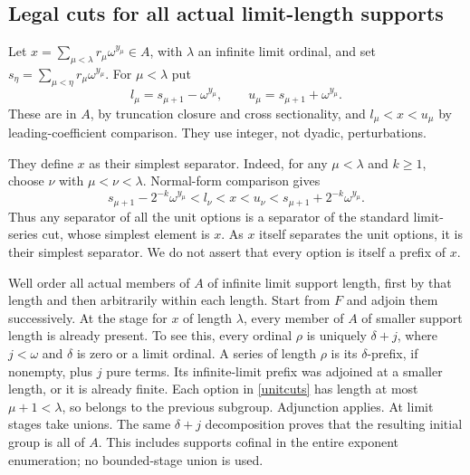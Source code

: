\documentclass[11pt]{article}
\begin{document}
\subsection{Legal cuts for all actual limit-length supports}
Let $x=\sum_{\mu<\lambda}r_\mu\omega^{y_\mu}\in A$, with $\lambda$ an
infinite limit ordinal, and set
$s_\eta=\sum_{\mu<\eta}r_\mu\omega^{y_\mu}$.
For $\mu<\lambda$ put
\begin{equation}\label{unitcuts}
 l_\mu=s_{\mu+1}-\omega^{y_\mu},\qquad
 u_\mu=s_{\mu+1}+\omega^{y_\mu}.
\end{equation}
These are in $A$, by truncation closure and cross sectionality, and
$l_\mu<x<u_\mu$ by leading-coefficient comparison.
They use integer, not dyadic, perturbations.

They define $x$ as their simplest separator. Indeed, for any $\mu<\lambda$
and $k\ge1$, choose $\nu$ with $\mu<\nu<\lambda$. Normal-form comparison
gives
\begin{equation}\label{cofinal}
 s_{\mu+1}-2^{-k}\omega^{y_\mu}
 <l_\nu<x<u_\nu<
 s_{\mu+1}+2^{-k}\omega^{y_\mu}.
\end{equation}
Thus any separator of all the unit options is a separator of the standard
limit-series cut, whose simplest element is $x$.
As $x$ itself separates the unit options, it is their simplest separator.
We do not assert that every option is itself a prefix of $x$.

Well order all actual members of $A$ of infinite limit support length,
first by that length and then arbitrarily within each length.
Start from $F$ and adjoin them successively. At the stage for $x$ of
length $\lambda$, every member of $A$ of smaller support length is already
present. To see this, every ordinal $\rho$ is uniquely $\delta+j$,
where $j<\omega$ and $\delta$ is zero or a limit ordinal.
A series of length $\rho$ is its $\delta$-prefix, if nonempty, plus
$j$ pure terms. Its infinite-limit prefix was adjoined at a smaller
length, or it is already finite. Each option in \eqref{unitcuts} has
length at most $\mu+1<\lambda$, so belongs to the previous subgroup.
Adjunction applies. At limit stages take unions.
The same $\delta+j$ decomposition proves that the resulting initial
group is all of $A$. This includes supports cofinal in the entire
exponent enumeration; no bounded-stage union is used.
\end{document}
